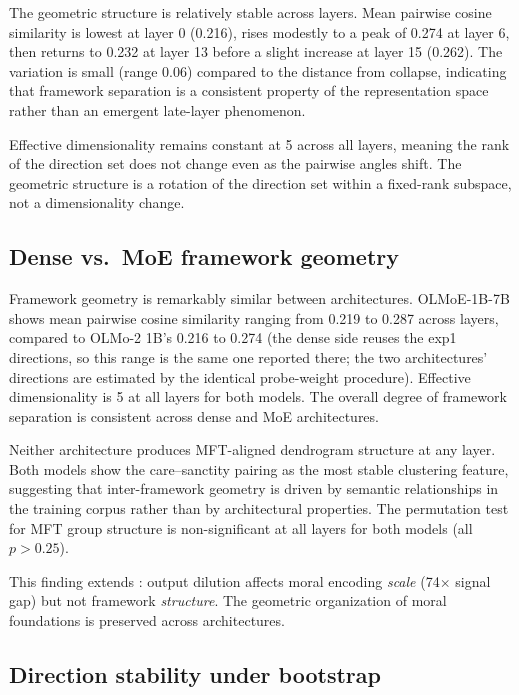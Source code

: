 The geometric structure is relatively stable across layers. Mean
pairwise cosine similarity is lowest at layer 0 (0.216), rises
modestly to a peak of 0.274 at layer 6, then returns to 0.232 at
layer 13 before a slight increase at layer 15 (0.262). The
variation is small (range 0.06) compared to the distance from
collapse, indicating that framework separation is a consistent
property of the representation space rather than an emergent
late-layer phenomenon.

Effective dimensionality remains constant at 5 across all layers,
meaning the rank of the direction set does not change even as the
pairwise angles shift. The geometric structure is a rotation of
the direction set within a fixed-rank subspace, not a
dimensionality change.

\subsection{Dense vs.~MoE framework geometry}\label{dense-vs.-moe-framework-geometry}

Framework geometry is remarkably similar between architectures.
OLMoE-1B-7B shows mean pairwise cosine similarity ranging from
0.219 to 0.287 across layers, compared to OLMo-2 1B's 0.216 to 0.274
(the dense side reuses the  exp1 directions, so this range is the
same one reported there; the two architectures' directions are
estimated by the identical probe-weight procedure). Effective
dimensionality is 5 at all layers for both models. The overall
degree of framework separation is consistent across dense and MoE
architectures.

Neither architecture produces MFT-aligned dendrogram structure at
any layer. Both models show the care--sanctity pairing as the
most stable clustering feature, suggesting that inter-framework
geometry is driven by semantic relationships in the training corpus
rather than by architectural properties. The permutation test for
MFT group structure is non-significant at all layers for both models
(all \(p > 0.25\)).

This finding extends \citet{reblitzrichardson2026dilution}: output
dilution affects moral encoding \emph{scale} (74\(\times\) signal gap) but
not framework \emph{structure}. The geometric organization of moral
foundations is preserved across architectures.

\subsection{Direction stability under bootstrap}\label{direction-stability-under-bootstrap}


